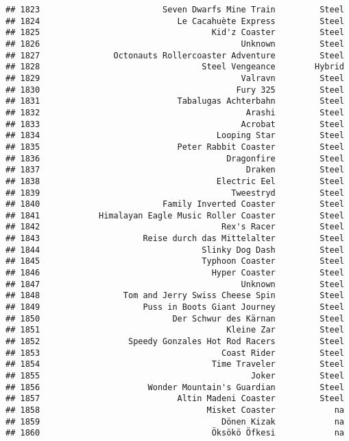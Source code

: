 \documentclass[
]{article}
\begin{document}
\begin{verbatim}
## 1823                         Seven Dwarfs Mine Train         Steel
## 1824                            Le Cacahuète Express         Steel
## 1825                                   Kid'z Coaster         Steel
## 1826                                         Unknown         Steel
## 1827               Octonauts Rollercoaster Adventure         Steel
## 1828                                 Steel Vengeance        Hybrid
## 1829                                         Valravn         Steel
## 1830                                        Fury 325         Steel
## 1831                            Tabalugas Achterbahn         Steel
## 1832                                          Arashi         Steel
## 1833                                         Acrobat         Steel
## 1834                                    Looping Star         Steel
## 1835                            Peter Rabbit Coaster         Steel
## 1836                                      Dragonfire         Steel
## 1837                                          Draken         Steel
## 1838                                    Electric Eel         Steel
## 1839                                       Tweestryd         Steel
## 1840                         Family Inverted Coaster         Steel
## 1841            Himalayan Eagle Music Roller Coaster         Steel
## 1842                                     Rex's Racer         Steel
## 1843                     Reise durch das Mittelalter         Steel
## 1844                                 Slinky Dog Dash         Steel
## 1845                                 Typhoon Coaster         Steel
## 1846                                   Hyper Coaster         Steel
## 1847                                         Unknown         Steel
## 1848                 Tom and Jerry Swiss Cheese Spin         Steel
## 1849                     Puss in Boots Giant Journey         Steel
## 1850                           Der Schwur des Kärnan         Steel
## 1851                                      Kleine Zar         Steel
## 1852                  Speedy Gonzales Hot Rod Racers         Steel
## 1853                                     Coast Rider         Steel
## 1854                                   Time Traveler         Steel
## 1855                                           Joker         Steel
## 1856                      Wonder Mountain's Guardian         Steel
## 1857                            Altin Madeni Coaster         Steel
## 1858                                  Misket Coaster            na
## 1859                                     Dönen Kizak            na
## 1860                                   Öksökö Öfkesi            na

\end{verbatim}
\end{document}
